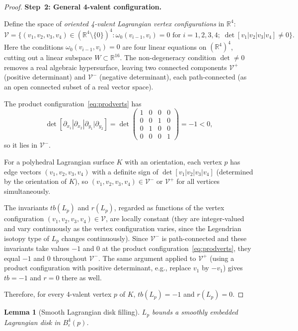 \documentclass[12pt]{article}
\newtheorem{lemma}[theorem]{Lemma}
\theoremstyle{definition}
\newcommand{\R}{\mathbb{R}}
\newcommand{\om}{\omega}
\newcommand{\eps}{\varepsilon}
\begin{document}
\begin{proof}
\medskip\noindent
\textbf{Step~2: General 4-valent configuration.}

Define the space of \emph{oriented 4-valent Lagrangian vertex
configurations} in $\R^4$:
\[
  \mathcal{V} = \bigl\{(v_1,v_2,v_3,v_4)\in(\R^4\setminus\{0\})^4 :
    \om_0(v_{i-1},v_i)=0\text{ for }i=1,2,3,4;\;
    \det[v_1|v_2|v_3|v_4]\ne0 \bigr\}.
\]
Here the conditions $\om_0(v_{i-1},v_i)=0$ are four linear equations on
$(\R^4)^4$, cutting out a linear subspace $W\subset\R^{16}$.  The
non-degeneracy condition $\det\ne0$ removes a real algebraic hypersurface,
leaving two connected components $\mathcal{V}^+$ (positive determinant)
and $\mathcal{V}^-$ (negative determinant), each path-connected (as an
open connected subset of a real vector space).

The product configuration~\eqref{eq:prodverts} has
\[
  \det[\partial_{x_1}|\partial_{x_2}|\partial_{y_1}|\partial_{y_2}]
  = \det\begin{pmatrix}1&0&0&0\\0&0&1&0\\0&1&0&0\\0&0&0&1\end{pmatrix}
  = -1 < 0,
\]
so it lies in $\mathcal{V}^-$.

For a polyhedral Lagrangian surface $K$ with an orientation, each vertex
$p$ has edge vectors $(v_1,v_2,v_3,v_4)$ with a definite sign of
$\det[v_1|v_2|v_3|v_4]$ (determined by the orientation of $K$), so
$(v_1,v_2,v_3,v_4)\in\mathcal{V}^-$ or $\mathcal{V}^+$ for all vertices
simultaneously.

The invariants $tb(L_p)$ and $r(L_p)$, regarded as functions of the vertex
configuration $(v_1,v_2,v_3,v_4)\in\mathcal{V}$, are locally constant
(they are integer-valued and vary continuously as the vertex configuration
varies, since the Legendrian isotopy type of $L_p$ changes continuously).
Since $\mathcal{V}^-$ is path-connected and these invariants take values
$-1$ and $0$ at the product configuration~\eqref{eq:prodverts}, they
equal $-1$ and $0$ throughout $\mathcal{V}^-$.  The same argument
applied to $\mathcal{V}^+$ (using a product configuration with positive
determinant, e.g., replace $v_1$ by $-v_1$) gives $tb=-1$ and $r=0$ there
as well.

Therefore, for every 4-valent vertex $p$ of $K$, $tb(L_p)=-1$ and $r(L_p)=0$.
\end{proof}

\begin{lemma}[Smooth Lagrangian disk filling]\label{lem:disk}
$L_p$ bounds a smoothly embedded Lagrangian disk in $B^4_\eps(p)$.
\end{lemma}
\end{document}
